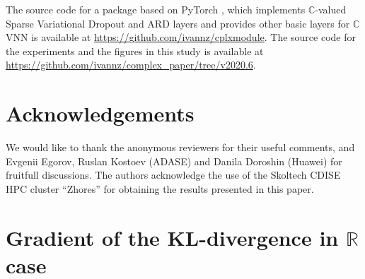 \documentclass[a4paper,10pt,twocolumn]{article}
\newcommand{\real}{\mathbb{R}}
\newcommand{\cplx}{\mathbb{C}}
\begin{document}

The source code for a package based on PyTorch \citep{paszke_pytorch_2019}, which
implements $\cplx$-valued Sparse Variational Dropout and ARD layers and provides other
basic layers for $\cplx$VNN is available at
\url{https://github.com/ivannz/cplxmodule}.
%
The source code for the experiments and the figures in this study is available at
\url{https://github.com/ivannz/complex_paper/tree/v2020.6}.


\section*{Acknowledgements} %
\label{sec:acknowledgements}


We would like to thank the anonymous reviewers for their useful comments, and Evgenii
Egorov, Ruslan Kostoev (ADASE) and Danila Doroshin (Huawei) for fruitfull discussions.
The authors acknowledge the use of the Skoltech CDISE HPC cluster ``Zhores'' for obtaining
the results presented in this paper.







\appendix
\onecolumn

\section{Gradient of the KL-divergence in $\real$ case} %
\label{sec:real-chisq-grad}  %
\end{document}
